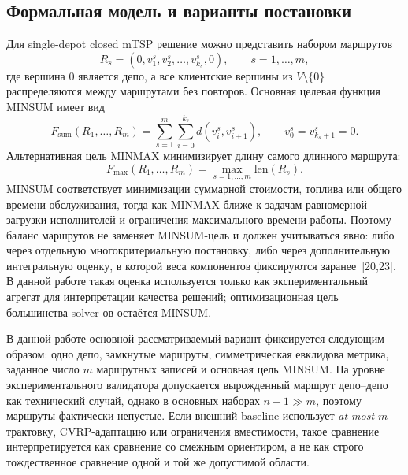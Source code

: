\documentclass[14pt,a4paper]{extarticle}
\newcommand{\source}[1]{[#1]}
\begin{document}
\subsection{Формальная модель и варианты постановки}

Для single-depot closed mTSP решение можно представить набором маршрутов
\begin{equation}
R_s=(0,v^s_1,v^s_2,\ldots,v^s_{k_s},0),\qquad s=1,\ldots,m,
\end{equation}
где вершина $0$ является депо, а все клиентские вершины из $V\setminus\{0\}$ распределяются между маршрутами без повторов. Основная целевая функция MINSUM имеет вид
\begin{equation}
F_{\mathrm{sum}}(R_1,\ldots,R_m)=
\sum_{s=1}^{m}\sum_{i=0}^{k_s} d(v^s_i,v^s_{i+1}),
\qquad v^s_0=v^s_{k_s+1}=0.
\end{equation}
Альтернативная цель MINMAX минимизирует длину самого длинного маршрута:
\begin{equation}
F_{\max}(R_1,\ldots,R_m)=\max_{s=1,\ldots,m} \mathrm{len}(R_s).
\end{equation}
MINSUM соответствует минимизации суммарной стоимости, топлива или общего времени обслуживания, тогда как MINMAX ближе к задачам равномерной загрузки исполнителей и ограничения максимального времени работы. Поэтому баланс маршрутов не заменяет MINSUM-цель и должен учитываться явно: либо через отдельную многокритериальную постановку, либо через дополнительную интегральную оценку, в которой веса компонентов фиксируются заранее~\source{20,23}. В данной работе такая оценка используется только как экспериментальный агрегат для интерпретации качества решений; оптимизационная цель большинства solver-ов остаётся MINSUM.

В данной работе основной рассматриваемый вариант фиксируется следующим образом: одно депо, замкнутые маршруты, симметрическая евклидова метрика, заданное число $m$ маршрутных записей и основная цель MINSUM. На уровне экспериментального валидатора допускается вырожденный маршрут депо--депо как технический случай, однако в основных наборах $n-1\gg m$, поэтому маршруты фактически непустые. Если внешний baseline использует \textit{at-most-$m$} трактовку, CVRP-адаптацию или ограничения вместимости, такое сравнение интерпретируется как сравнение со смежным ориентиром, а не как строго тождественное сравнение одной и той же допустимой области.
\end{document}
